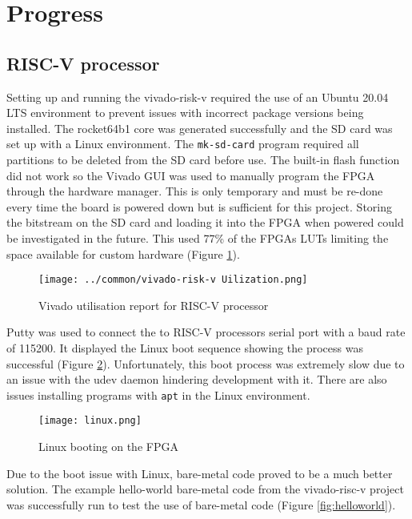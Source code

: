 \section{Progress}
\label{sec:progress}

\subsection{RISC-V processor}
Setting up and running the vivado-risk-v \cite{vivado-risk-v} required the use of an Ubuntu 20.04 LTS environment to prevent issues with incorrect package versions being installed. The rocket64b1 core was generated successfully and the SD card was set up with a Linux environment. The \texttt{mk-sd-card} program required all partitions to be deleted from the SD card before use. The built-in flash function did not work so the Vivado GUI was used to manually program the FPGA through the hardware manager. This is only temporary and must be re-done every time the board is powered down but is sufficient for this project. Storing the bitstream on the SD card and loading it into the FPGA when powered could be investigated in the future. This used 77\% of the FPGAs LUTs limiting the space available for custom hardware (Figure \ref{fig:LUT_usage}).

\begin{figure}[H]
	\centering
	\texttt{[image: ../common/vivado-risk-v Uilization.png]}
	\caption{Vivado utilisation report for RISC-V processor}
	\label{fig:LUT_usage}
\end{figure}

Putty was used to connect the to RISC-V processors serial port with a baud rate of 115200. It displayed the Linux boot sequence showing the process was successful (Figure \ref{fig:linux}). Unfortunately, this boot process was extremely slow due to an issue with the udev daemon hindering development with it. There are also issues installing programs with \texttt{apt} in the Linux environment.

\begin{figure}[H]
	\centering
	\texttt{[image: linux.png]}
	\caption{Linux booting on the FPGA}
	\label{fig:linux}
\end{figure}

Due to the boot issue with Linux, bare-metal code proved to be a much better solution. The example hello-world bare-metal code from the vivado-risc-v project was successfully run to test the use of bare-metal code (Figure \ref{fig:helloworld}).

